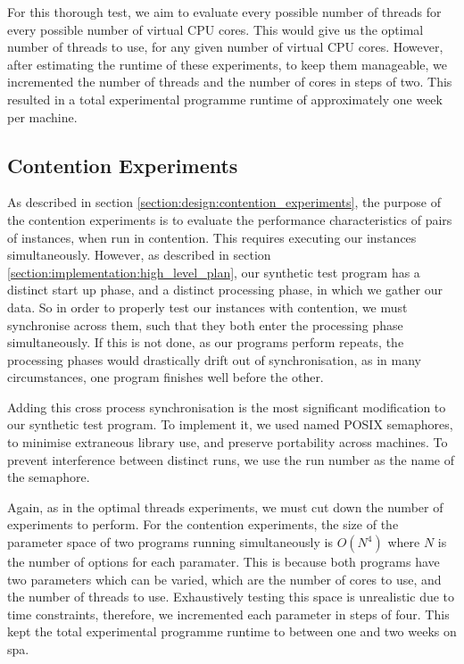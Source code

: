 For this thorough test, we aim to evaluate every possible number of threads for every possible number of virtual CPU cores. This would give us the optimal number of threads to use, for any given number of virtual CPU cores. However, after estimating the runtime of these experiments, to keep them manageable, we incremented the number of threads and the number of cores in steps of two. This resulted in a total experimental programme runtime of approximately one week per machine.



\subsection{Contention Experiments}
\label{section:experimental_methodology:contention_experiments}

As described in section \ref{section:design:contention_experiments}, the purpose of the contention experiments is to evaluate the performance characteristics of pairs of instances, when run in contention. This requires executing our instances simultaneously. However, as described in section \ref{section:implementation:high_level_plan}, our synthetic test program has a distinct start up phase, and a distinct processing phase, in which we gather our data. So in order to properly test our instances with contention, we must synchronise across them, such that they both enter the processing phase simultaneously. If this is not done, as our programs perform repeats, the processing phases would drastically drift out of synchronisation, as in many circumstances, one program finishes well before the other.

Adding this cross process synchronisation is the most significant modification to our synthetic test program. To implement it, we used named POSIX semaphores, to minimise extraneous library use, and preserve portability across machines. To prevent interference between distinct runs, we use the run number as the name of the semaphore.

Again, as in the optimal threads experiments, we must cut down the number of experiments to perform. For the contention experiments, the size of the parameter space of two programs running simultaneously is $O(N^4)$ where $N$ is the number of options for each paramater. This is because both programs have two parameters which can be varied, which are the number of cores to use, and the number of threads to use. Exhaustively testing this space is unrealistic due to time constraints, therefore, we incremented each parameter in steps of four. This kept the total experimental programme runtime to between one and two weeks on spa.

